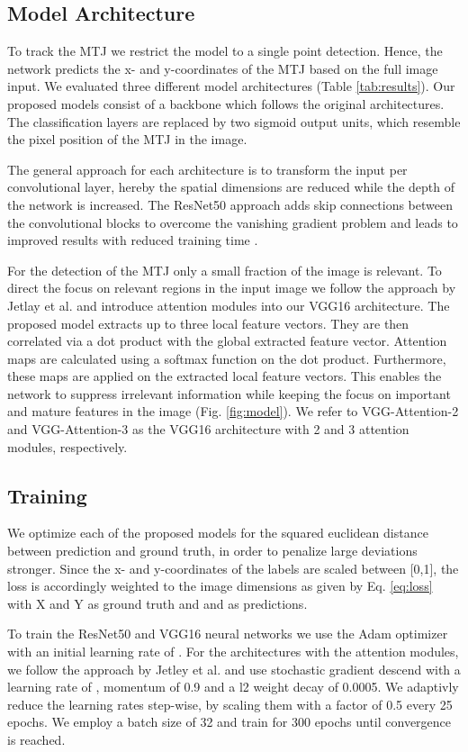 \documentclass[letterpaper, 10 pt, conference]{ieeeconf}
\begin{document}
\subsection{Model Architecture}

To track the MTJ we restrict the model to a single point detection. Hence, the network predicts the x- and y-coordinates of the MTJ based on the full image input. We evaluated three different model architectures (Table \ref{tab:results}). Our proposed models consist of a backbone which follows the original architectures. The classification layers are replaced by two sigmoid output units, which resemble the pixel position of the MTJ in the image. 

The general approach for each architecture is to transform the input per convolutional layer, hereby the spatial dimensions are reduced while the depth of the network is increased. The ResNet50 approach adds skip connections between the convolutional blocks to overcome the vanishing gradient problem and leads to improved results with reduced training time \cite{Attention}. 

For the detection of the MTJ only a small fraction of the image is relevant. To direct the focus on relevant regions in the input image we follow the approach by Jetlay et al. \cite{Attention} and introduce attention modules into our VGG16 architecture. The proposed model extracts up to three local feature vectors. They are then correlated via a dot product with the global extracted feature vector. Attention maps are calculated using a softmax function on the dot product. Furthermore, these maps are applied on the extracted local feature vectors. This enables the network to suppress irrelevant information while keeping the focus on important and mature features in the image (Fig. \ref{fig:model}). We refer to VGG-Attention-2 and VGG-Attention-3 as the VGG16 architecture with 2 and 3 attention modules, respectively.
\subsection{Training}
\label{sect:training}
We optimize each of the proposed models for the squared euclidean distance between prediction and ground truth, in order to penalize large deviations stronger. Since the x- and y-coordinates of the labels are scaled between [0,1], the loss is accordingly weighted to the image dimensions as given by Eq. \ref{eq:loss} with X and Y as ground truth and  and  as predictions.

To train the ResNet50 and VGG16 neural networks we use the Adam optimizer \cite{adam_optimizer} with an initial learning rate of . For the architectures with the attention modules, we follow the approach by Jetley et al. \cite{Attention} and use stochastic gradient descend with a learning rate of , momentum of 0.9 and a l2 weight decay of 0.0005.
We adaptivly reduce the learning rates step-wise, by scaling them with a factor of 0.5 every 25 epochs. We employ a batch size of 32 and train for 300 epochs until convergence is reached.
\end{document}
